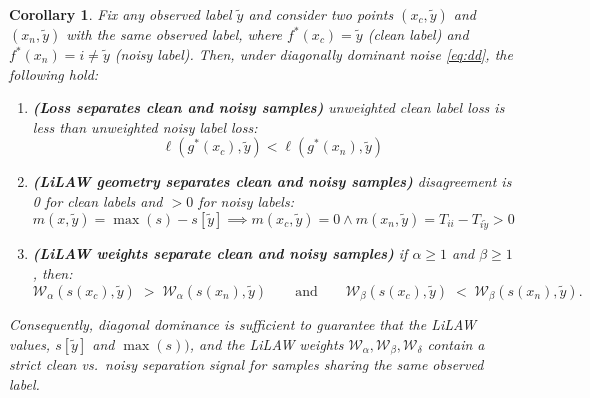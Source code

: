 \documentclass{article}
\theoremstyle{plain}
\newtheorem{corollary}[theorem]{Corollary}
\theoremstyle{definition}
\theoremstyle{remark}
\begin{document}
\begin{corollary}
Fix any observed label $\tilde{y}$ and consider two points $(x_c,\tilde y)$ and $(x_n,\tilde y)$
with the same observed label, where $f^*(x_c)=\tilde y$ (clean label) and
$f^*(x_n)=i\neq \tilde y$ (noisy label).
Then, under diagonally dominant noise \eqref{eq:dd}, the following hold:
\begin{enumerate}[label=(\roman*),leftmargin=*]
\item \textbf{(Loss separates clean and noisy samples)} unweighted clean label loss is less than unweighted noisy label loss:
\[
\ell(g^*(x_c),\tilde y) < \ell(g^*(x_n),\tilde y)
\]
\item \textbf{(LiLAW geometry separates clean and noisy samples)} disagreement is 0 for clean labels and $> 0$ for noisy labels:
\[
m(x,\tilde y) = \max(s) - s[\tilde y] \implies m(x_c,\tilde y)=0 \wedge m(x_n,\tilde y)=T_{ii}-T_{i\tilde y}>0
\]
\item \textbf{(LiLAW weights separate clean and noisy samples)} if $\alpha\ge 1$ and $\beta\ge 1$, then:
\[
\mathcal{W}_{\alpha}(s(x_c),\tilde y) \;>\; \mathcal{W}_{\alpha}(s(x_n),\tilde y)
\qquad\text{and}\qquad
\mathcal{W}_{\beta}(s(x_c),\tilde y) \;<\; \mathcal{W}_{\beta}(s(x_n),\tilde y).
\]
\end{enumerate}
Consequently, diagonal dominance is sufficient to guarantee that the LiLAW values, $s[\tilde y]$ and $\max(s))$, and the LiLAW weights $\mathcal{W}_{\alpha},\mathcal{W}_{\beta},\mathcal{W}_{\delta}$ contain a strict clean vs.\ noisy separation signal for samples sharing the same observed label.
\end{corollary}
\end{document}
